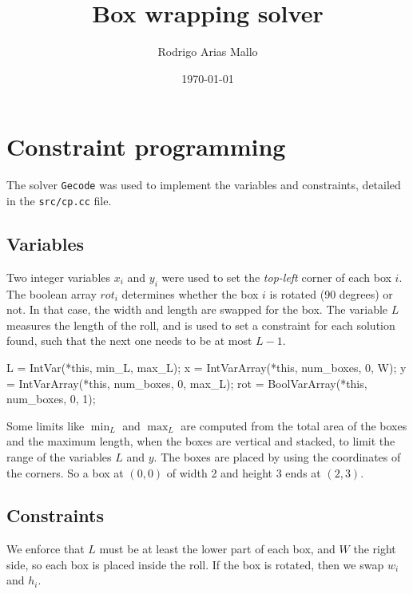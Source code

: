 \documentclass[a4paper]{article}
\title{Box wrapping solver}
\author{Rodrigo Arias Mallo}
\date{\today}
\begin{document}
\maketitle

\section{Constraint programming}

The solver \texttt{Gecode} was used to implement the variables and constraints, 
detailed in the \texttt{src/cp.cc} file.

\subsection{Variables}

Two integer variables $x_i$ and $y_i$ were used to set the \textsl{top-left} 
corner of each box $i$. The boolean array $rot_i$ determines whether the box $i$ 
is rotated (90 degrees) or not. In that case, the width and length are swapped 
for the box. The variable $L$ measures the length of the roll, and is used to 
set a constraint for each solution found, such that the next one needs to be at 
most $L - 1$.
%
\begin{cppcode}
L = IntVar(*this, min_L, max_L);
x = IntVarArray(*this, num_boxes, 0, W);
y = IntVarArray(*this, num_boxes, 0, max_L);
rot = BoolVarArray(*this, num_boxes, 0, 1);
\end{cppcode}
%
Some limits like $\min_L$ and $\max_L$ are computed from the total area of the 
boxes and the maximum length, when the boxes are vertical and stacked, to limit 
the range of the variables $L$ and $y$. The boxes are placed by using the 
coordinates of the corners. So a box at $(0,0)$ of width 2 and height 3 ends at 
$(2,3)$.

\subsection{Constraints}

We enforce that $L$ must be at least the lower part of each box, and $W$ the 
right side, so each box is placed inside the roll. If the box is rotated, then 
we swap $w_i$ and $h_i$.
\end{document}

